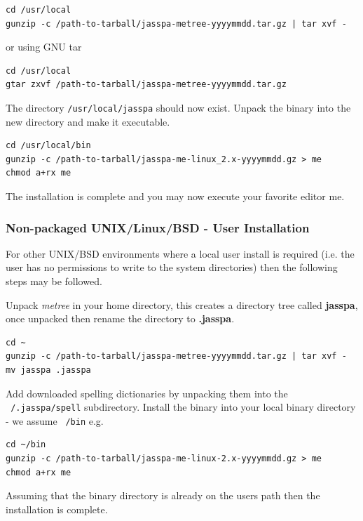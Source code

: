 \documentclass[11pt,a4paper,pdftex]{article}
\begin{document}
\begin{verbatim}
cd /usr/local
gunzip -c /path-to-tarball/jasspa-metree-yyyymmdd.tar.gz | tar xvf -
\end{verbatim}

    or using GNU tar

\begin{verbatim}
cd /usr/local
gtar zxvf /path-to-tarball/jasspa-metree-yyyymmdd.tar.gz
\end{verbatim}

   The directory \texttt{/usr/local/jasspa} should now exist. Unpack the
   binary into the new directory and make it executable.

\begin{verbatim}
cd /usr/local/bin
gunzip -c /path-to-tarball/jasspa-me-linux_2.x-yyyymmdd.gz > me
chmod a+rx me
\end{verbatim}

    The installation is complete and you may now execute your favorite editor me.

\subsubsection{Non-packaged UNIX/Linux/BSD - User Installation}

    For other UNIX/BSD environments where a local user install is required
    (i.e. the user has no permissions to write to the system directories) then
    the following steps may be followed.

    Unpack \textit{metree} in your home directory, this creates a directory
    tree called \textbf{jasspa}, once unpacked then rename the directory to
    \textbf{.jasspa}.

\begin{verbatim}
cd ~
gunzip -c /path-to-tarball/jasspa-metree-yyyymmdd.tar.gz | tar xvf -
mv jasspa .jasspa
\end{verbatim}

Add downloaded spelling dictionaries by unpacking them into the
\texttt{~/.jasspa/spell} subdirectory. Install the binary into your local
binary directory - we assume \texttt{~/bin} e.g.

\begin{verbatim}
cd ~/bin
gunzip -c /path-to-tarball/jasspa-me-linux-2.x-yyyymmdd.gz > me
chmod a+rx me
\end{verbatim}

Assuming that the binary directory is already on the users path then the
installation is complete.
\end{document}
